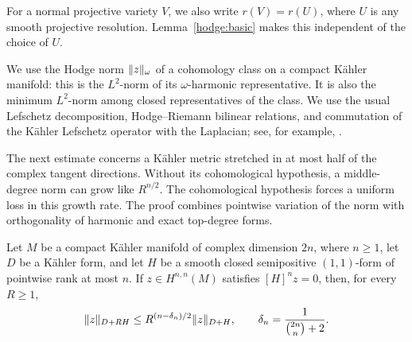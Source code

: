 For a normal projective variety $V$, we also write $r(V)=r(U)$, where
$U$ is any smooth projective resolution. Lemma~\ref{hodge:basic} makes
this independent of the choice of $U$.

We use the Hodge norm $\lVert z\rVert_\omega$ of a cohomology class on a compact
K\"ahler manifold: this is the $L^2$-norm of its $\omega$-harmonic
representative.  It is also the minimum $L^2$-norm among closed
representatives of the class.  We use the usual Lefschetz decomposition,
Hodge--Riemann bilinear relations, and commutation of the K\"ahler
Lefschetz operator with the Laplacian; see, for example,
\citet{Voisin2002}.

The next estimate concerns a K\"ahler metric stretched in at most half of
the complex tangent directions.  Without its cohomological hypothesis,
a middle-degree norm can grow like $R^{n/2}$.  The cohomological hypothesis forces a uniform loss
in this growth rate. The proof combines pointwise variation of the norm
with orthogonality of harmonic and exact top-degree forms.

\begin{lemma}\label{lem:hodge-gap}
Let $M$ be a compact K\"ahler manifold of complex dimension $2n$, where
$n\ge1$, let $D$ be a K\"ahler form, and let $H$ be a smooth closed
semipositive $(1,1)$-form of pointwise rank at most $n$.  If
$z\in H^{n,n}(M)$ satisfies $[H]^n z=0$, then, for every $R\ge1$,
\begin{equation}\label{hodge:gap}
 \lVert z\rVert_{D+RH}
 \le R^{(n-\delta_n)/2}\lVert z\rVert_{D+H},
 \qquad
 \delta_n=\frac{1}{\binom{2n}{n}+2}.
\end{equation}
\end{lemma}

